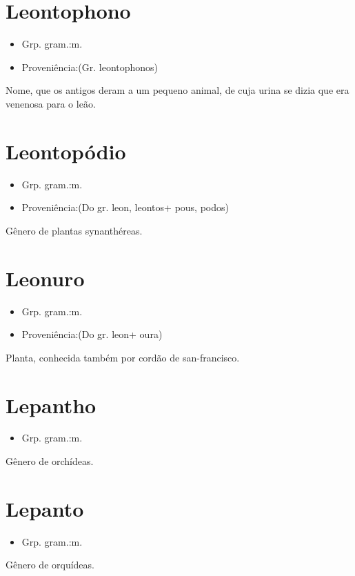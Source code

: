\section{Leontophono}
\begin{itemize}
\item {Grp. gram.:m.}
\end{itemize}
\begin{itemize}
\item {Proveniência:(Gr. \textunderscore leontophonos\textunderscore )}
\end{itemize}
Nome, que os antigos deram a um pequeno animal, de cuja urina se dizia que era venenosa para o leão.
\section{Leontopódio}
\begin{itemize}
\item {Grp. gram.:m.}
\end{itemize}
\begin{itemize}
\item {Proveniência:(Do gr. \textunderscore leon\textunderscore , \textunderscore leontos\textunderscore  + \textunderscore pous\textunderscore , \textunderscore podos\textunderscore )}
\end{itemize}
Gênero de plantas synanthéreas.
\section{Leonuro}
\begin{itemize}
\item {Grp. gram.:m.}
\end{itemize}
\begin{itemize}
\item {Proveniência:(Do gr. \textunderscore leon\textunderscore  + \textunderscore oura\textunderscore )}
\end{itemize}
Planta, conhecida também por \textunderscore cordão de san-francisco\textunderscore .
\section{Lepantho}
\begin{itemize}
\item {Grp. gram.:m.}
\end{itemize}
Gênero de orchídeas.
\section{Lepanto}
\begin{itemize}
\item {Grp. gram.:m.}
\end{itemize}
Gênero de orquídeas.
